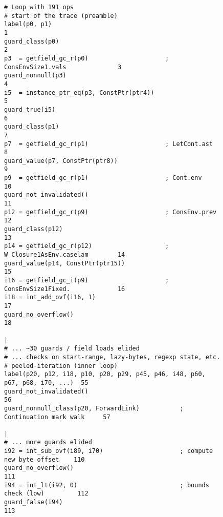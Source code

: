 \begin{figure}[!htbp]
	\centering

	\begin{minipage}{0.95\textwidth}
\begin{lstlisting}[style=rptrace-style]
# Loop with 191 ops
# start of the trace (preamble)
label(p0, p1)                                                                1
guard_class(p0)                                                              2
p3  = getfield_gc_r(p0)                     ; ConsEnvSize1.vals              3
guard_nonnull(p3)                                                            4
i5  = instance_ptr_eq(p3, ConstPtr(ptr4))                                    5
guard_true(i5)                                                               6
guard_class(p1)                                                              7
p7  = getfield_gc_r(p1)                     ; LetCont.ast                    8
guard_value(p7, ConstPtr(ptr8))                                              9
p9  = getfield_gc_r(p1)                     ; Cont.env                       10
guard_not_invalidated()                                                      11
p12 = getfield_gc_r(p9)                     ; ConsEnv.prev                   12
guard_class(p12)                                                             13
p14 = getfield_gc_r(p12)                    ; W_Closure1AsEnv.caselam        14
guard_value(p14, ConstPtr(ptr15))                                            15
i16 = getfield_gc_i(p9)                     ; ConsEnvSize1Fixed.             16
i18 = int_add_ovf(i16, 1)                                                    17
guard_no_overflow()                                                          18
                                                                             |
# ... ~30 guards / field loads elided
# ... checks on start-range, lazy-bytes, regexp state, etc.
# peeled-iteration (inner loop)
label(p20, p12, i18, p10, p20, p29, p45, p46, i48, p60, p67, p68, i70, ...)  55
guard_not_invalidated()                                                      56
guard_nonnull_class(p20, ForwardLink)           ; Continuation mark walk     57
                                                                             |
# ... more guards elided
i92 = int_sub_ovf(i89, i70)                     ; compute new byte offset    110
guard_no_overflow()                                                          111
i94 = int_lt(i92, 0)                            ; bounds check (low)         112
guard_false(i94)                                                             113

\end{lstlisting}
\end{minipage}
\end{figure}
